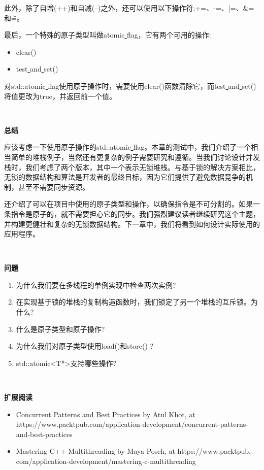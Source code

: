 此外，除了自增(++)和自减(--)之外，还可以使用以下操作符:+=、-=、|=、\&=和\^=。 \par
最后，一个特殊的原子类型叫做atomic\underline{ }flag，它有两个可用的操作: \par

\begin{itemize}
	\item clear()
	\item test\underline{ }and\underline{ }set()
\end{itemize}

对std::atomic\underline{ }flag使用原子操作时，需要使用clear()函数清除它，而test\underline{ }and\underline{ }set()将值更改为true，并返回前一个值。 \par

\noindent\textbf{}\ \par
\textbf{总结} \ \par
应该考虑一下使用原子操作的std::atomic\underline{ }flag。本章的测试中，我们介绍了一个相当简单的堆栈例子，当然还有更复杂的例子需要研究和遵循。当我们讨论设计并发栈时，我们考虑了两个版本，其中一个表示无锁堆栈。与基于锁的解决方案相比，无锁的数据结构和算法是开发者的最终目标，因为它们提供了避免数据竞争的机制，甚至不需要同步资源。 \par
还介绍了可以在项目中使用的原子类型和操作，以确保指令是不可分割的。如果一条指令是原子的，就不需要担心它的同步。我们强烈建议读者继续研究这个主题，并构建更健壮和复杂的无锁数据结构。下一章中，我们将看到如何设计实际使用的应用程序。 \par

\noindent\textbf{}\ \par
\textbf{问题} \ \par
\begin{enumerate}
	\item 为什么我们要在多线程的单例实现中检查两次实例?
	\item 在实现基于锁的堆栈的复制构造函数时，我们锁定了另一个堆栈的互斥锁。为什么?
	\item 什么是原子类型和原子操作?
	\item 为什么我们对原子类型使用load()和store() ?
	\item std::atomic<T*>支持哪些操作?
\end{enumerate}

\noindent\textbf{}\ \par
\textbf{扩展阅读} \ \par
\begin{itemize}
	\item Concurrent Patterns and Best Practices by Atul Khot, at https://www.packtpub.com/application-development/concurrent-patterns-and-best-practices
	\item Mastering C++ Multithreading by Maya Posch, at  https:/​/​www.​packtpub.​com/application-​development/​mastering-​c-​multithreading
\end{itemize}

\newpage
































